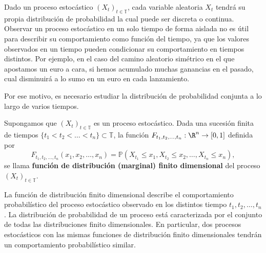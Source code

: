 Dado un proceso estocástico $(X_t)_{t\in \mathbb{T}}$, cada variable aleatoria $X_t$ tendrá su propia distribución de probabilidad la cual puede ser discreta o continua. Observar un proceso estocástico en un solo tiempo de forma aislada no es útil para describir su comportamiento como función del tiempo, ya que los valores observados en un tiempo pueden condicionar su comportamiento en tiempos distintos. Por ejemplo, en el caso del camino aleatorio simétrico en el que apostamos un euro a cara, si hemos acumulado muchas ganancias en el pasado, cual disminuirá a lo sumo en un euro en cada lanzamiento.

Por ese motivo, es necesario estudiar la distribución de probabilidad conjunta a lo largo de varios tiempos.
 \begin{definition}
     Supongamos que $(X_t)_{t\in \mathbb{T}}$ es un proceso estocástico. Dada una sucesión finita de tiempos $\{t_1<t_2<\dots<t_n\}\subset \mathbb{T} $, la función $F_{t_1,t_2,\dots,t_n}:\R^n\to [0,1]$ definida por \[
     F_{t_1,t_2,\dots,t_n}(x_1,x_2,\dots,x_n)=\mathbb{P}(X_{t_1}\le x_1,X_{t_2}\le x_2,\dots,X_{t_n}\le x_n),
     \] se llama \textbf{función de distribución (marginal) finito dimensional} del proceso $(X_t)_{t\in \mathbb{T}}$.
\end{definition}
La función de distribución finito dimensional describe el comportamiento probabilístico del proceso estocástico observado en los distintos tiempo $t_1,t_2,\dots,t_n$. La distribución de probabilidad de un proceso está caracterizada por el conjunto de todas las distribuciones finito dimensionales. En particular, dos procesos estocásticos con las mismas funciones de distribución finito dimensionales tendrán un comportamiento probabilístico similar.


